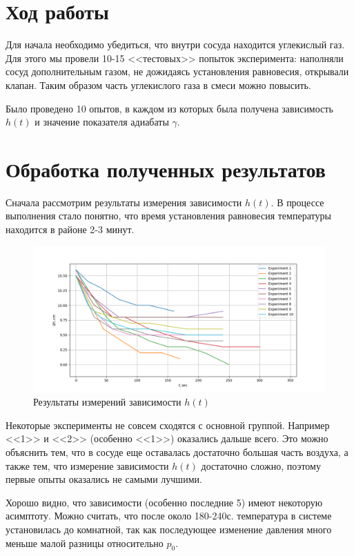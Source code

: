 \documentclass[a4paper,12pt]{article}
\begin{document}
    \section*{Ход работы}
    Для начала необходимо убедиться, что внутри сосуда находится углекислый газ. Для этого мы провели 10-15 <<тестовых>> попыток эксперимента: наполняли сосуд дополнительным газом, не дожидаясь установления равновесия, открывали клапан. Таким образом часть углекислого газа в смеси можно повысить.

    Было проведено 10 опытов, в каждом из которых была получена зависимость $h(t)$ и значение показателя адиабаты $\gamma$.

    \section*{Обработка полученных результатов}

    Сначала рассмотрим результаты измерения зависимости $h(t)$. В процессе выполнения стало понятно, что время установления равновесия температуры находится в районе 2-3 минут.

    \begin{figure}[H]
        \centering
        \includegraphics*[width=1\linewidth]{h(t).png}
        \caption{Результаты измерений зависимости $h(t)$}
    \end{figure}    

    Некоторые эксперименты не совсем сходятся с основной группой. Например <<1>> и <<2>> (особенно <<1>>) оказались дальше всего. Это можно объяснить тем, что в сосуде еще оставалась достаточно большая часть воздуха, а также тем, что измерение зависимости $h(t)$ достаточно сложно, поэтому первые опыты оказались не самыми лучшими.
    
    Хорошо видно, что зависимости (особенно последние 5) имеют некоторую асимптоту. Можно считать, что после около 180-240с. температура в системе установилась до комнатной, так как последующее изменение давления много меньше малой разницы относительно $p_0$.
\end{document}
